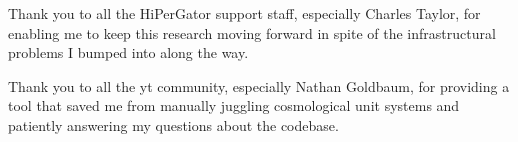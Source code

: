 Thank you to all the HiPerGator support staff, especially Charles Taylor, for enabling me to keep this research moving forward in spite of the infrastructural problems I bumped into along the way.

Thank you to all the yt community, especially Nathan Goldbaum, for providing a tool that saved me from manually juggling cosmological unit systems and patiently answering my questions about the codebase.

